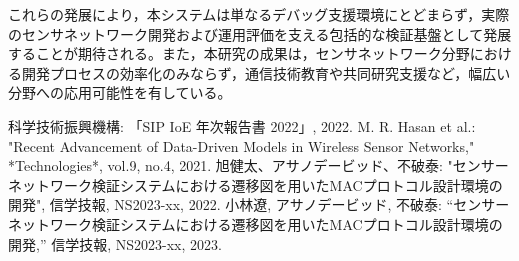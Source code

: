 \documentclass[technicalreport]{ieicej}
\begin{document}
これらの発展により，本システムは単なるデバッグ支援環境にとどまらず，実際のセンサネットワーク開発および運用評価を支える包括的な検証基盤として発展することが期待される。また，本研究の成果は，センサネットワーク分野における開発プロセスの効率化のみならず，通信技術教育や共同研究支援など，幅広い分野への応用可能性を有している。
\baselineskip





%
%

\begin{thebibliography}{99}
 科学技術振興機構: 「SIP IoE 年次報告書 2022」, 2022.
 M. R. Hasan et al.: "Recent Advancement of Data-Driven Models in Wireless Sensor Networks," *Technologies*, vol.9, no.4, 2021.
 旭健太、アサノデービッド、不破泰: "センサーネットワーク検証システムにおける遷移図を用いたMACプロトコル設計環境の開発", 信学技報, NS2023-xx, 2022.
 小林遼, アサノデービッド, 不破泰:
“センサーネットワーク検証システムにおける遷移図を用いたMACプロトコル設計環境の開発,”
信学技報, NS2023-xx, 2023.

\end{thebibliography}
\end{document}
